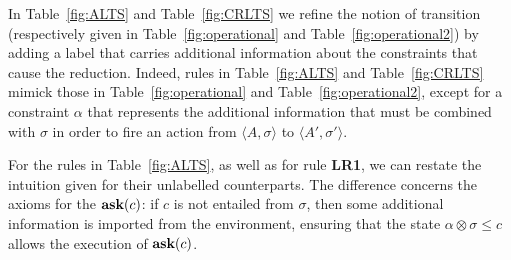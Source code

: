 \documentclass{llncs}
\def\1{{\mathbf 1}}
\newcommand{\comment}[1]{}
\newcommand{\ask}{{\bf ask}}
\newcommand{\ostop}{{\bf stop}}
\newcommand{\rarrow}{\rightarrow}
\def\1{{\mathbf 1}}
\begin{document}

In Table~\ref{fig:ALTS} and Table~\ref{fig:CRLTS} we refine the notion of transition (respectively given in Table~\ref{fig:operational} and Table~\ref{fig:operational2})
by adding a label that carries additional information about the constraints that cause the reduction.
Indeed, rules in Table~\ref{fig:ALTS} and Table~\ref{fig:CRLTS} mimick those in Table~\ref{fig:operational} and Table~\ref{fig:operational2}, except for a constraint $\alpha$ that
represents the additional information that must be combined with $\sigma$ in order to fire an action
from $\langle A, \sigma\rangle$  to $\langle A', \sigma' \rangle$.

For the rules in Table~\ref{fig:ALTS}, as well as for rule {\bf  LR1}, we can restate the intuition given for their unlabelled counterparts. 
The difference concerns the axioms for the $\hbox{\ask}(c)$: if $c$ is not entailed from $\sigma$, then
some additional information  is imported from the environment, ensuring that the state
$\alpha \otimes \sigma \leq c$ allows the execution of $\hbox{\ask}(c)$.
\comment{The requirement $\alpha \leq \1$ ensures that the received information strengthens the store, 
i.e., $\alpha \otimes \sigma \leq \sigma$.
\todo{$\alpha \leq \1$ si pu\`o rimuovere}}
\end{document}
